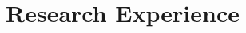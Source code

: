 \documentclass[letterpaper]{deedy-resume_sm} %
\begin{document}
\section{Research Experience}
\end{document}
